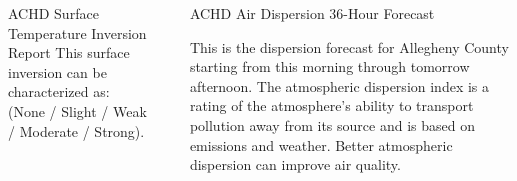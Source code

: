 \documentclass[final, xcolor=table]{beamer}
\newlength{\sepwidth}
\newlength{\colwidth}
\newcommand{\separatorcolumn}{\begin{column}{\sepwidth}\end{column}}
\begin{document}
\begin{frame}[t]
\begin{columns}[t]
\begin{column}{\colwidth}
\begin{block}{ACHD Surface Temperature Inversion Report}
    This surface inversion can be characterized as: \underline{\textbf{\Scale}} (None / Slight / Weak / Moderate / Strong). 
    
    \Inversion

  \end{block}

\end{column} 

\separatorcolumn



\begin{column}{\colwidth}


  \begin{block}{ACHD Air Dispersion 36-Hour Forecast}

    This is the dispersion forecast for Allegheny County starting from this morning through tomorrow afternoon. The atmospheric dispersion index is a rating of the atmosphere’s ability to transport pollution away from its source and is based on emissions and weather. Better atmospheric dispersion can improve air quality.


\end{block}
\end{column}
\end{columns}
\end{frame}
\end{document}
